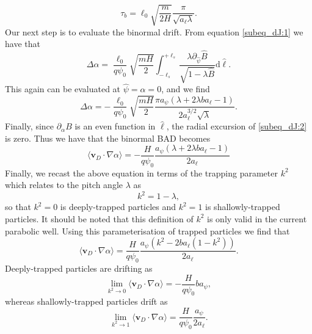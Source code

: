 \begin{equation}
    \tau_b = \ell_0 \sqrt{\frac{m}{2H}} \frac{\pi}{\sqrt{a_\ell \lambda}}.
\end{equation}
Our next step is to evaluate the binormal drift. From equation \eqref{subeq_dJ:1} we have that
\begin{equation}
    \Delta \alpha = \frac{\ell_0}{q \psi_0 }\sqrt{\frac{mH}{2}} \int_{-\ell_s}^{+\ell_s} \frac{ \lambda \partial_{\hat{\psi}} \hat{B}}{\sqrt{1 - \lambda \hat{B}}} \mathrm{d} \hat{\ell}.
    \label{eq:Delta_alpha_integral}
\end{equation}
This again can be evaluated at $\hat{\psi}=\alpha=0$, and we find
\begin{equation}
    \Delta \alpha = - \frac{\ell_0}{q \psi_0 }\sqrt{\frac{mH}{2}} \frac{\pi a_\psi (\lambda + 2 \lambda b a_\ell - 1)}{2 a_\ell^{3/2} \sqrt{\lambda}}.
\end{equation}
Finally, since $\partial_\alpha B$ is an even function in $\hat{\ell}$, the radial excursion of \eqref{subeq_dJ:2} is zero. Thus we have that the binormal BAD becomes
\begin{equation}
\langle \mathbf{v}_D \cdot \nabla \alpha \rangle = - \frac{H}{q \psi_0} \frac{a_\psi \left( \lambda + 2 \lambda b a_\ell - 1 \right)}{2 a_\ell}
\end{equation}
Finally, we recast the above equation in terms of the trapping parameter $k^2$ which relates to the pitch angle $\lambda$ as
\begin{equation}
    k^2 = 1 - \lambda,
\end{equation}
so that $k^2=0$ is deeply-trapped particles and $k^2=1$ is shallowly-trapped particles. It should be noted that this definition of $k^2$ is only valid in the current parabolic well. Using this parameterisation of trapped particles we find that
\begin{equation}
\langle \mathbf{v}_D \cdot \nabla \alpha \rangle = \frac{H}{q \psi_0} \frac{a_\psi \left( k^2 -  2 b a_\ell (1 - k^2) \right)}{2 a_\ell}.
\end{equation}
Deeply-trapped particles are drifting as
\begin{equation}
    \lim_{k^2\rightarrow 0} \langle \mathbf{v}_D \cdot \nabla \alpha \rangle = - \frac{H}{q \psi_0} b a_\psi,
\end{equation}
whereas shallowly-trapped particles drift as
\begin{equation}
    \lim_{k^2\rightarrow 1} \langle \mathbf{v}_D \cdot \nabla \alpha \rangle = \frac{H}{q \psi_0} \frac{a_\psi}{2 a_\ell}.
\end{equation} 
